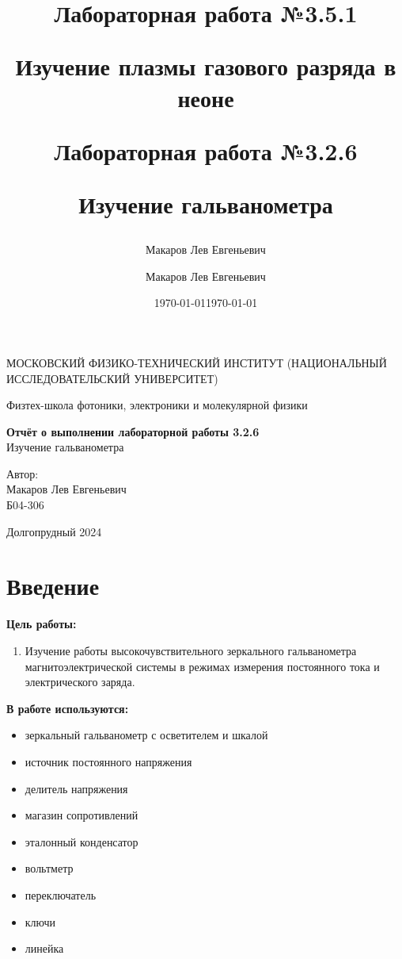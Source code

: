 \documentclass[a4paper,12pt]{article}
\author{Макаров Лев Евгеньевич}
\title{Лабораторная работа №3.5.1

Изучение плазмы газового разряда в неоне
}
\date{\today}
\author{Макаров Лев Евгеньевич}
\title{Лабораторная работа №3.2.6

Изучение гальванометра
}
\date{\today}
\begin{document}
\begin{titlepage}
	\begin{center}
		{\large МОСКОВСКИЙ ФИЗИКО-ТЕХНИЧЕСКИЙ ИНСТИТУТ (НАЦИОНАЛЬНЫЙ ИССЛЕДОВАТЕЛЬСКИЙ УНИВЕРСИТЕТ)}
	\end{center}
	\begin{center}
		{\large Физтех-школа фотоники, электроники и молекулярной физики}
	\end{center}
	
	
	\vspace{4.5cm}
	{\huge
		\begin{center}
			{\bf Отчёт о выполнении лабораторной работы 3.2.6}\\
			Изучение гальванометра
		\end{center}
	}
	\vspace{2cm}
	\begin{flushright}
		{\LARGE Автор:\\ Макаров Лев Евгеньевич \\
			\vspace{0.2cm}
			Б04-306}
	\end{flushright}
	\vspace{8cm}
	\begin{center}
		Долгопрудный 2024
	\end{center}
\end{titlepage}

\section{Введение}

\textbf{Цель работы:} 
\begin{enumerate}
	\item Изучение работы высокочувствительного зеркального гальванометра магнитоэлектрической системы в режимах измерения постоянного тока и электрического заряда.
\end{enumerate}

\textbf{В работе используются:} 
\begin{itemize}
    \item зеркальный гальванометр с осветителем и шкалой
    \item источник постоянного напряжения
    \item делитель напряжения
    \item магазин сопротивлений
    \item эталонный конденсатор
    \item вольтметр
    \item переключатель
    \item ключи
    \item линейка
\end{itemize}
\medskip
\end{document}
